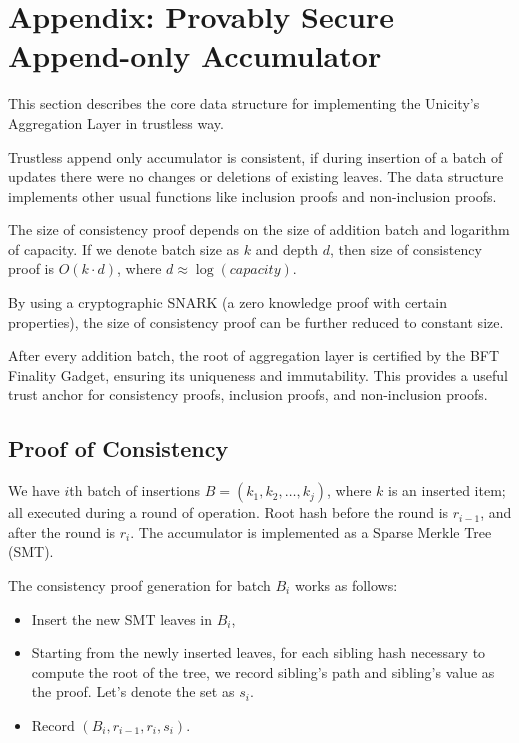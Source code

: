 \documentclass{article}
\begin{document}
\section{Appendix: Provably Secure Append-only Accumulator}

This section describes the core data structure for implementing the Unicity's Aggregation Layer in trustless way.

Trustless append only accumulator is consistent, if during insertion of a batch of updates there were no changes or deletions of existing leaves. The data structure implements other usual functions like inclusion proofs and non-inclusion proofs.

The size of consistency proof depends on the size of addition batch and logarithm of capacity. If we denote batch size as $k$ and depth $d$, then size of consistency proof is $O(k \cdot d)$, where $d \approx \log(capacity)$.

By using a cryptographic SNARK (a zero knowledge proof with certain properties), the size of consistency proof can be further reduced to constant size.

After every addition batch, the root of aggregation layer is certified by the BFT Finality Gadget, ensuring its uniqueness and immutability. This provides a useful trust anchor for consistency proofs, inclusion proofs, and non-inclusion proofs.

\subsection{Proof of Consistency}

We have $i$th batch of insertions $B = (k_1, k_2, \dots, k_j)$, where $k$ is an inserted item; all executed during a round of operation. Root hash before the round is $r_{i-1}$, and after the round is $r_i$. The accumulator is implemented as a Sparse Merkle Tree (SMT).

The consistency proof generation for batch $B_i$ works as follows:

\begin{itemize}
    \item Insert the new SMT leaves in $B_i$,
    \item Starting from the newly inserted leaves, for each sibling hash necessary to compute the root of the tree, we record sibling's path and sibling's value as the proof. Let's denote the set as $s_i$.
    \item Record $(B_i, r_{i-1}, r_i, s_i)$.
\end{itemize}
\end{document}
